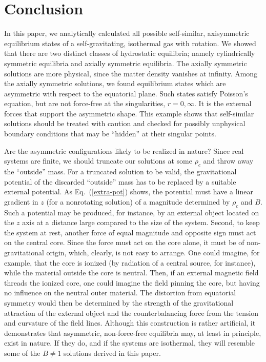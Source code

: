 \section{Conclusion \label{S:CONCL} }

In this paper, we analytically calculated all possible self-similar, 
axisymmetric equilibrium states of a self-gravitating, isothermal gas with 
rotation. We showed that there are two distinct classes of hydrostatic 
equilibria; namely cylindrically symmetric equilibria and axially symmetric 
equilibria. The axially symmetric solutions are more physical, since the 
matter density vanishes at infinity. Among 
the axially symmetric solutions, we found equilibrium states which are 
asymmetric with respect to the equatorial plane. Such states satisfy Poisson's 
equation, but are not force-free at the singularities, $r=0,\infty$.
It is the external forces that support the asymmetric shape.
This example shows that self-similar solutions should be treated with 
caution and checked for possibly unphysical boundary conditions that may be 
``hidden'' at their singular points. 

Are the asymmetric configurations likely to be realized in nature? 
Since real systems are finite, we should truncate our solutions at 
some $\rho_c$ and throw away the ``outside'' mass. For a truncated solution 
to be valid, the gravitational potential of the discarded ``outside'' mass has 
to be replaced by a suitable external potential. As Eq.\ (\ref{extra-pot}) 
shows, the potential must have a linear gradient in $z$ (for a nonrotating
solution) of a magnitude determined by $\rho_c$ and $B$. Such a potential 
may be produced, for instance, by an external object located on the $z$ 
axis at a distance large compared to the size of the system. Second, 
to keep the system at rest, another force of equal magnitude and opposite 
sign must act on the central core. Since the force must act on the core alone,
it must be of non-gravitational origin, which, clearly, is not easy to
arrange. One could imagine, for example, that the core is ionized (by radiation 
of a central source, for instance), while the material outside the core is 
neutral. Then, if an external magnetic field threads the ionized core, one 
could imagine the field pinning the core, but having no influence on the 
neutral outer material. The distortion from equatorial symmetry would then 
be determined by the strength of the gravitational attraction of the external 
object and the counterbalancing force from the tension and curvature of the
field lines. Although this construction is rather artificial, it demonstrates 
that asymmetric, non-force-free equilibria may, at least in principle, exist 
in nature. If they do, and if the systems are isothermal, they will resemble
some of the $B\not=1$ solutions derived in this paper.


